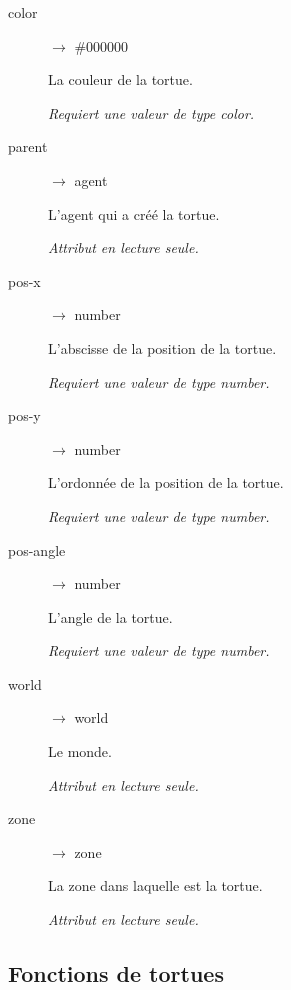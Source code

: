 \begin{description}
	\item[color] $\rightarrow$ \#000000

	La couleur de la tortue.

	\emph{Requiert une valeur de type color.}

	\item[parent] $\rightarrow$ agent

	L'agent qui a créé la tortue.

	\emph{Attribut en lecture seule.}

	\item[pos-x] $\rightarrow$ number

	L'abscisse de la position de la tortue.

	\emph{Requiert une valeur de type number.}

	\item[pos-y] $\rightarrow$ number

	L'ordonnée de la position de la tortue.

	\emph{Requiert une valeur de type number.}

	\item[pos-angle] $\rightarrow$ number

	L'angle de la tortue.

	\emph{Requiert une valeur de type number.}

	\item[world] $\rightarrow$ world

	Le monde.

	\emph{Attribut en lecture seule.}

	\item[zone] $\rightarrow$ zone

	La zone dans laquelle est la tortue.

	\emph{Attribut en lecture seule.}
\end{description}

\subsection{Fonctions de tortues}

